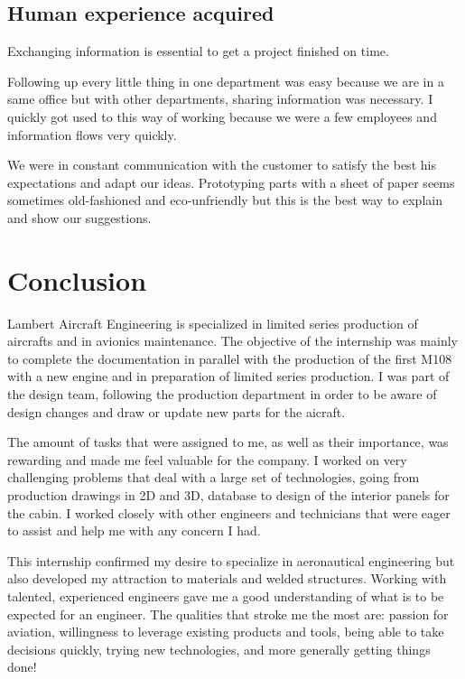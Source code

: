 \documentclass[11pt,a4paper]{article}
\begin{document}
\subsection{Human experience acquired}
Exchanging information is essential to get a project finished on time. 

\bigskip

Following up every little thing in one department was easy because we are in a same office but with other departments, sharing information was necessary. I quickly got used to this way of working because we were a few employees and information flows very quickly.

\bigskip

We were in constant communication with the customer to satisfy the best his expectations and adapt our ideas. Prototyping parts with a sheet of paper seems sometimes old-fashioned and eco-unfriendly but this is the best way to explain and show our suggestions.

\newpage

\section{Conclusion}
Lambert Aircraft Engineering is specialized in limited series production of aircrafts and in avionics maintenance. The objective of the internship was mainly to complete the documentation in parallel with the production of the first M108 with a new engine and in preparation of limited series production. I was part of the design team, following the production department in order to be aware of design changes and draw or update new parts for the aicraft.

\bigskip

The amount of tasks that were assigned to me, as well as their importance, was rewarding and made me feel valuable for the company. I worked on very challenging problems that deal with a large set of technologies, going from production drawings in 2D and 3D, database to design of the interior panels for the cabin. I worked closely with other engineers and technicians that were eager to assist and help me with any concern I had.

\bigskip

This internship confirmed my desire to specialize in aeronautical engineering but also developed my attraction to materials and welded structures. Working with talented, experienced engineers gave me a good understanding of what is to be expected for an engineer. The qualities that stroke me the most are: passion for aviation, willingness to leverage existing products and tools, being able to take decisions quickly, trying new technologies, and more generally getting things done!
\end{document}
